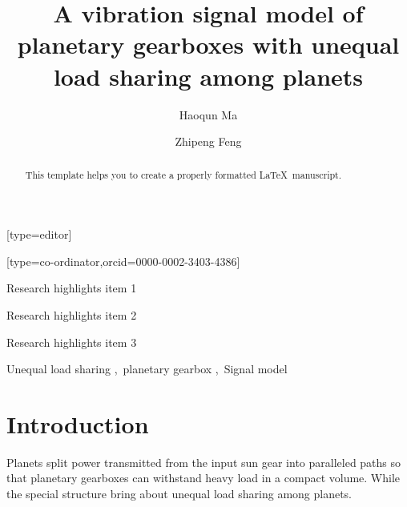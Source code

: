 \documentclass[a4paper,fleqn]{cas-sc}
\begin{document}
\let\WriteBookmarks\relax
\def\floatpagepagefraction{1}
\def\textpagefraction{.001}

\title[mode = title]{A vibration signal model of planetary gearboxes with unequal load sharing among planets}
\author[1]{Haoqun Ma}[type=editor]
\address[1]{University of Science and Technology Beijing, No.30, Xueyuan Road, Haidian District, Beijing.}
\author[1]{Zhipeng Feng}[type=co-ordinator,orcid=0000-0002-3403-4386]
\cormark[1]
\begin{abstract}
    This template helps you to create a properly formatted \LaTeX\ manuscript.
\end{abstract}
\begin{highlights}
    \item Research highlights item 1
    \item Research highlights item 2
    \item Research highlights item 3
\end{highlights}
\begin{keywords}
    Unequal load sharing \sep\ planetary gearbox \sep\ Signal model
\end{keywords}
    
\maketitle
\section{Introduction}
\par Planets split power transmitted from the input sun gear into paralleled paths so that planetary gearboxes can withstand heavy load in a compact volume. While the special structure bring about unequal load sharing among planets.
\end{document}
